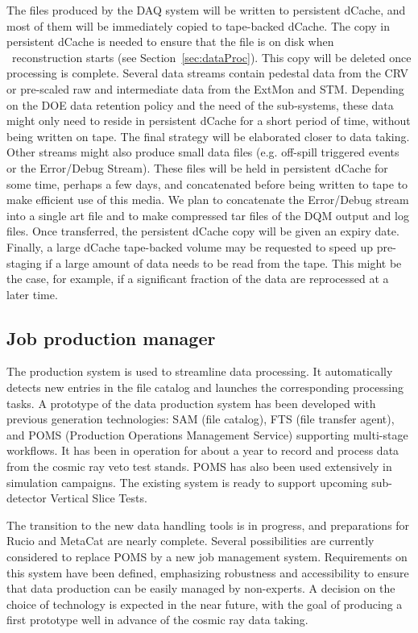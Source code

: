The files produced by the DAQ system will be written to persistent dCache, and most of them will be immediately copied to tape-backed dCache. The copy in persistent dCache is needed to ensure that the file is on disk when \passone\ reconstruction starts (see Section~\ref{sec:dataProc}). This copy will be deleted once processing is complete. Several data streams contain pedestal data from the CRV or pre-scaled raw and intermediate data from the ExtMon and STM. Depending on the DOE data retention policy and the need of the sub-systems, these data might only need to reside in persistent dCache for a short period of time, without being written on tape. The final strategy will be elaborated closer to data taking. Other streams might also produce small data files (e.g. off-spill triggered events or the Error/Debug Stream). These files will be held in persistent dCache for some time, perhaps a few days, and concatenated before being written to tape to make efficient use of this media. We plan to concatenate the Error/Debug stream into a single art file and to make compressed tar files of the DQM output and log files. Once transferred, the persistent dCache copy will be given an expiry date. Finally, a large dCache tape-backed volume may be requested to speed up pre-staging if a large amount of data needs to be read from the tape. This might be the case, for example, if a significant fraction of the data are reprocessed at a later time.

\subsection{Job production manager}
The production system is used to streamline data processing. It automatically detects new entries in the file catalog and launches the corresponding processing tasks. A prototype of the data production system has been developed with previous generation technologies: SAM (file catalog), FTS (file transfer agent), and POMS (Production Operations Management Service) supporting multi-stage workflows. It has been in operation for about a year to record and process data from the cosmic ray veto test stands. POMS has also been used extensively in simulation campaigns. The existing system is ready to support upcoming sub-detector Vertical Slice Tests. 

The transition to the new data handling tools is in progress, and  preparations for Rucio and MetaCat are nearly complete. Several possibilities are currently considered to replace POMS by a new job management system. Requirements on this system have been defined, emphasizing robustness and accessibility to ensure that data production can be easily managed by non-experts. A decision on the choice of technology is expected in the near future, with the goal of producing a first prototype well in advance of the cosmic ray data taking.    


